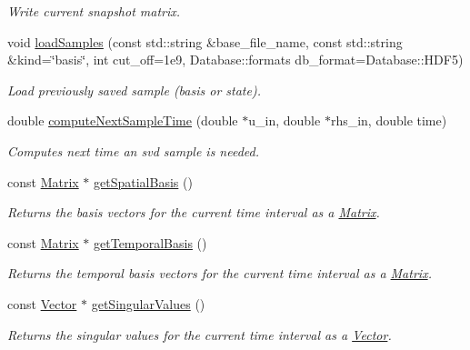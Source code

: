 \begin{DoxyCompactItemize}
\begin{DoxyCompactList}\small\item\em Write current snapshot matrix. \end{DoxyCompactList}\item 
void \hyperlink{class_c_a_r_o_m_1_1_basis_generator_a6a62155535209b2ca67207043cffc29e}{load\-Samples} (const std\-::string \&base\-\_\-file\-\_\-name, const std\-::string \&kind=\char`\"{}basis\char`\"{}, int cut\-\_\-off=1e9, Database\-::formats db\-\_\-format=\-Database\-::\-H\-D\-F5)
\begin{DoxyCompactList}\small\item\em Load previously saved sample (basis or state). \end{DoxyCompactList}\item 
double \hyperlink{class_c_a_r_o_m_1_1_basis_generator_ab4e33379fd6b66633c9c98ed5ea770e9}{compute\-Next\-Sample\-Time} (double $\ast$u\-\_\-in, double $\ast$rhs\-\_\-in, double time)
\begin{DoxyCompactList}\small\item\em Computes next time an svd sample is needed. \end{DoxyCompactList}\item 
const \hyperlink{class_c_a_r_o_m_1_1_matrix}{Matrix} $\ast$ \hyperlink{class_c_a_r_o_m_1_1_basis_generator_a9823bb3cb51c1fad86e0f8ef33af82f5}{get\-Spatial\-Basis} ()
\begin{DoxyCompactList}\small\item\em Returns the basis vectors for the current time interval as a \hyperlink{class_c_a_r_o_m_1_1_matrix}{Matrix}. \end{DoxyCompactList}\item 
const \hyperlink{class_c_a_r_o_m_1_1_matrix}{Matrix} $\ast$ \hyperlink{class_c_a_r_o_m_1_1_basis_generator_a8f5cf06defb7b872cbbedfc329f0fe4b}{get\-Temporal\-Basis} ()
\begin{DoxyCompactList}\small\item\em Returns the temporal basis vectors for the current time interval as a \hyperlink{class_c_a_r_o_m_1_1_matrix}{Matrix}. \end{DoxyCompactList}\item 
const \hyperlink{class_c_a_r_o_m_1_1_vector}{Vector} $\ast$ \hyperlink{class_c_a_r_o_m_1_1_basis_generator_afb6b66f706cf7773f330b77db1a6252f}{get\-Singular\-Values} ()
\begin{DoxyCompactList}\small\item\em Returns the singular values for the current time interval as a \hyperlink{class_c_a_r_o_m_1_1_vector}{Vector}. \end{DoxyCompactList}\item 

\end{DoxyCompactItemize}
